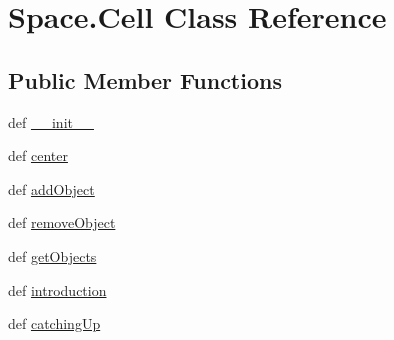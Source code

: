 \hypertarget{classSpace_1_1Cell}{\section{\-Space.\-Cell \-Class \-Reference}
\label{classSpace_1_1Cell}
}
\subsection*{\-Public \-Member \-Functions}
\begin{DoxyCompactItemize}
\item 
def \hyperlink{classSpace_1_1Cell_a924291fc11b25771ca67349d046eced5}{\-\_\-\-\_\-init\-\_\-\-\_\-}
\item 
def \hyperlink{classSpace_1_1Cell_a4ca073a5587452ac2efc91a5281e7e55}{center}
\item 
def \hyperlink{classSpace_1_1Cell_a0e044b5a744e0e7756fb9be0f7a0d1ff}{add\-Object}
\item 
def \hyperlink{classSpace_1_1Cell_ae42d3c27c10761a26288b2a3e4127873}{remove\-Object}
\item 
def \hyperlink{classSpace_1_1Cell_a4ce4dbf71e809f6f0e73a45adf3d8fac}{get\-Objects}
\item 
def \hyperlink{classSpace_1_1Cell_a2f4efef93b8307f4c0856ebd99171155}{introduction}
\item 
def \hyperlink{classSpace_1_1Cell_aaf19831256434c36cc7408936db65bfe}{catching\-Up}
\end{DoxyCompactItemize}
